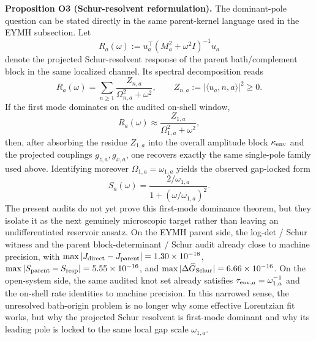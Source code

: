 \documentclass[aps,prd,onecolumn,notitlepage,nofootinbib,superscriptaddress,11pt,floatfix]{revtex4-2}
\begin{document}
\medskip\noindent\textbf{Proposition O3 (Schur-resolvent reformulation).}
The dominant-pole question can be stated directly in the same parent-kernel language used in the EYMH subsection. Let
\[
R_a(\omega):=u_a^{\top}(M_a^2+\omega^2 I)^{-1}u_a
\]
denote the projected Schur-resolvent response of the parent bath/complement block in the same localized channel. Its spectral decomposition reads
\[
R_a(\omega)=\sum_{n\ge1}\frac{Z_{n,a}}{\Omega_{n,a}^2+\omega^2},
\qquad
Z_{n,a}:=|\langle u_a,n,a\rangle|^2\ge 0.
\]
If the first mode dominates on the audited on-shell window,
\[
R_a(\omega)\approx \frac{Z_{1,a}}{\Omega_{1,a}^2+\omega^2},
\]
then, after absorbing the residue $Z_{1,a}$ into the overall amplitude block $\kappa_{\rm env}$ and the projected couplings $g_{z,a},g_{x,a}$, one recovers exactly the same single-pole family used above. Identifying moreover $\Omega_{1,a}=\omega_{1,a}$ yields the observed gap-locked form
\[
S_a(\omega)=\frac{2/\omega_{1,a}}{1+(\omega/\omega_{1,a})^2}.
\]
The present audits do not yet prove this first-mode dominance theorem, but they isolate it as the next genuinely microscopic target rather than leaving an undifferentiated reservoir ansatz. On the EYMH parent side, the log-det / Schur witness and the parent block-determinant / Schur audit already close to machine precision, with $\max|J_{\rm direct}-J_{\rm parent}|=1.30\times10^{-18}$, $\max|S_{\rm parent}-S_{\rm resp}|=5.55\times10^{-16}$, and $\max|\Delta \widehat G_{\rm Schur}|=6.66\times10^{-16}$. On the open-system side, the same audited knot set already satisfies $\tau_{{\rm env},a}=\omega_{1,a}^{-1}$ and the on-shell rate identities to machine precision. In this narrowed sense, the unresolved bath-origin problem is no longer why some effective Lorentzian fit works, but why the projected Schur resolvent is first-mode dominant and why its leading pole is locked to the same local gap scale $\omega_{1,a}$.
\end{document}
